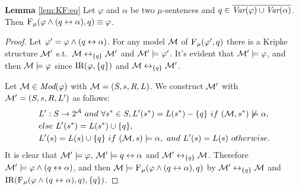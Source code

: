 \documentclass[runningheads]{llncs}
\begin{document}
\noindent\textbf{Lemma}
\ref{lem:KF:eq}
Let $\varphi$ and $\alpha$ be two $\mu$-sentences and $q\in 	\overline{\textit{Var}(\varphi) \cup \textit{Var}(\alpha)}$. Then
 	${\textsc{F}_{\textsc{$\mu$}}}(\varphi \wedge (q\leftrightarrow\alpha), q)\equiv \varphi$.

     \begin{proof}
 	Let $\varphi' =\varphi \wedge (q\leftrightarrow\alpha)$. For any model ${\cal M}$ of ${\textsc{F}_{\textsc{$\mu$}}}(\varphi', q)$ there is a Kripke structure ${\cal M}'$ s.t.\ ${\cal M}\leftrightarrow_{\{q\}}{\cal M}'$ and ${\cal M}' \models \varphi'$. It's evident that ${\cal M}' \models \varphi$, and then ${\cal M} \models \varphi$ since $\textrm{IR}(\varphi,\{q\})$ and ${\cal M} \leftrightarrow_{\{q\}} {\cal M}'$.

 	Let ${\cal M} \in \textit{Mod}(\varphi)$ with ${\cal M}=(S, s, R, L)$. We construct ${\cal M}'$ with ${\cal M}' = (S, s, R, L')$ as follows:
     \begin{align*}
       & L':S \rto 2^{\Ha}\ and\ \forall s^*\in S, L'(s^*) = L(s^*) - \{q\}\ if\ (\Hm, s^*) \not \models \alpha,\\
       & else\ L'(s^*) = L(s^*)\cup\{q\}, \\
       & L'(s) = L(s) \cup\{q\}\ if\ (\Hm, s) \models \alpha,\ and\ L'(s) = L(s) \ otherwise.
     \end{align*}
 	It is clear that ${\cal M}' \models \varphi$, ${\cal M}' \models q\leftrightarrow \alpha$ and
 	${\cal M}' \leftrightarrow_{\{q\}} {\cal M}$. Therefore ${\cal M}' \models \varphi \wedge (q\leftrightarrow\alpha)$, and then ${\cal M} \models {\textsc{F}_{\textsc{$\mu$}}} (\varphi \wedge (q\leftrightarrow\alpha), q)$ by
 	${\cal M}' \leftrightarrow_{\{q\}} {\cal M}$ and $\textrm{IR}({\textsc{F}_{\textsc{$\mu$}}} (\varphi \wedge (q\leftrightarrow\alpha), q), \{q\})$.
 \end{proof}
\end{document}
